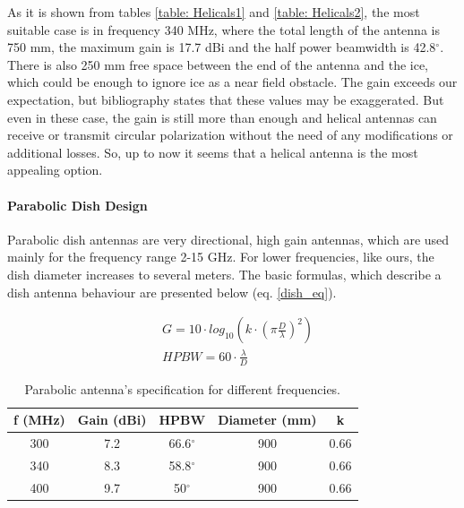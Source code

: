 As it is shown from tables \ref{table: Helicals1} and \ref{table: Helicals2}, the most suitable case is in frequency 340 MHz, where the total length of the antenna is 750 mm, the maximum gain is 17.7 dBi and the half power beamwidth is 42.8$^\circ$. There is also 250 mm free space between the end of the antenna and the ice, which could be enough to ignore ice as a near field obstacle. The gain exceeds our expectation, but bibliography states that these values may be exaggerated. But even in these case, the gain is still more than enough and helical antennas can receive or transmit circular polarization without the need of any modifications or additional losses. So, up to now it seems that a helical antenna is the most appealing option.

\paragraph{Parabolic Dish Design}
Parabolic dish antennas are very directional, high gain antennas, which are used mainly for the frequency range 2-15 GHz. For lower frequencies, like ours, the dish diameter increases to several meters. The basic formulas, which describe a dish antenna behaviour are presented below (eq. \ref{dish_eq}).

\begin{subequations}
\begin{align}
    &G=10 \cdot log_{10}(k \cdot (\pi \frac{D}{\lambda})^2) \\
    &HPBW=60 \cdot \frac{\lambda}{D}
\end{align}
\label{dish_eq}
\end{subequations}

\begin{table}[H]
\centering
\begin{tabular}{| c | c | c | c | c |}
\hline
 f (MHz) & Gain (dBi) & HPBW & Diameter (mm) & k \\ 
 \hline
 300 & 7.2 & 66.6$^\circ$ & 900 & 0.66 \\  
 \hline
 340 & 8.3 & 58.8$^\circ$ & 900 & 0.66\\
 \hline
  400 & 9.7 & 50$^\circ$ & 900 & 0.66\\
 \hline
\end{tabular}
\caption{Parabolic antenna's specification for different frequencies.}
\label{table: dish}
\end{table}

